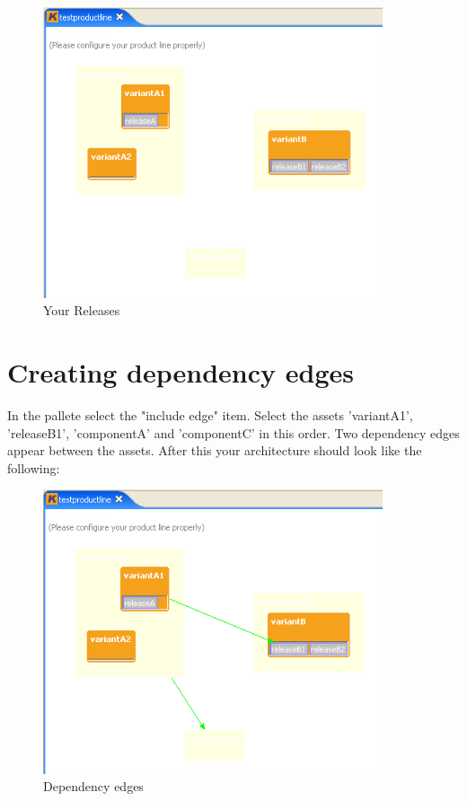 \begin{figure}[h!]
\begin{center}
\includegraphics[width=10cm]{tutorial12.png}
   \caption{Your Releases}
\end{center}
\end{figure}\par



\section{Creating dependency edges}

In the pallete select the "include edge" item. Select the assets 'variantA1', 'releaseB1', 
'componentA' and 'componentC' in this order. Two dependency edges appear between the
assets. After this your architecture should look like the following:

\begin{figure}[h!]
\begin{center}
\includegraphics[width=10cm]{tutorial13.png}
   \caption{Dependency edges}
\end{center}
\end{figure}\par



